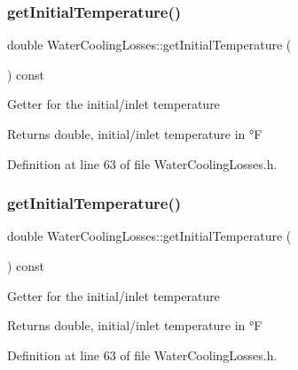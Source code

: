 \subsubsection{\texorpdfstring{get\+Initial\+Temperature()}{getInitialTemperature()}\hspace{0.1cm}{\footnotesize\ttfamily [2/3]}}
{\footnotesize\ttfamily double Water\+Cooling\+Losses\+::get\+Initial\+Temperature (\begin{DoxyParamCaption}{ }\end{DoxyParamCaption}) const\hspace{0.3cm}{\ttfamily [inline]}}

Getter for the initial/inlet temperature \begin{DoxyReturn}{Returns}
double, initial/inlet temperature in °F 
\end{DoxyReturn}


Definition at line 63 of file Water\+Cooling\+Losses.\+h.

\mbox{\label{class_water_cooling_losses_a205b469029ec9cd4d792169bf8589f24}} 
\subsubsection{\texorpdfstring{get\+Initial\+Temperature()}{getInitialTemperature()}\hspace{0.1cm}{\footnotesize\ttfamily [3/3]}}
{\footnotesize\ttfamily double Water\+Cooling\+Losses\+::get\+Initial\+Temperature (\begin{DoxyParamCaption}{ }\end{DoxyParamCaption}) const\hspace{0.3cm}{\ttfamily [inline]}}

Getter for the initial/inlet temperature \begin{DoxyReturn}{Returns}
double, initial/inlet temperature in °F 
\end{DoxyReturn}


Definition at line 63 of file Water\+Cooling\+Losses.\+h.

\mbox{\label{class_water_cooling_losses_a79fb78755e813b2a3aa36ccd8ccebf7a}} 
